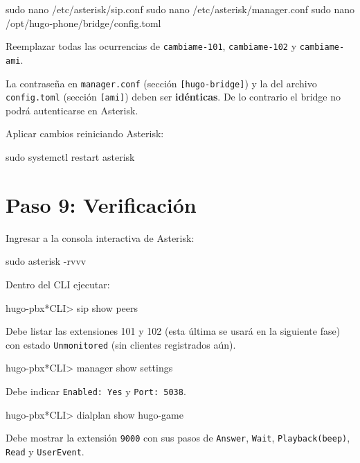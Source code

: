\begin{shellcode}
sudo nano /etc/asterisk/sip.conf
sudo nano /etc/asterisk/manager.conf
sudo nano /opt/hugo-phone/bridge/config.toml
\end{shellcode}

Reemplazar todas las ocurrencias de \texttt{cambiame-101}, \texttt{cambiame-102} y \texttt{cambiame-ami}.

\begin{advertencia}
La contraseña en \texttt{manager.conf} (sección \texttt{[hugo-bridge]}) y la del archivo \texttt{config.toml} (sección \texttt{[ami]}) deben ser \textbf{idénticas}. De lo contrario el bridge no podrá autenticarse en Asterisk.
\end{advertencia}

Aplicar cambios reiniciando Asterisk:

\begin{shellcode}
sudo systemctl restart asterisk
\end{shellcode}

\section{Paso 9: Verificación}

Ingresar a la consola interactiva de Asterisk:

\begin{shellcode}
sudo asterisk -rvvv
\end{shellcode}

Dentro del CLI ejecutar:

\begin{plaincode}
hugo-pbx*CLI> sip show peers
\end{plaincode}

Debe listar las extensiones 101 y 102 (esta última se usará en la siguiente fase) con estado \texttt{Unmonitored} (sin clientes registrados aún).

\begin{plaincode}
hugo-pbx*CLI> manager show settings
\end{plaincode}

Debe indicar \texttt{Enabled: Yes} y \texttt{Port: 5038}.

\begin{plaincode}
hugo-pbx*CLI> dialplan show hugo-game
\end{plaincode}

Debe mostrar la extensión \texttt{9000} con sus pasos de \texttt{Answer}, \texttt{Wait}, \texttt{Playback(beep)}, \texttt{Read} y \texttt{UserEvent}.

